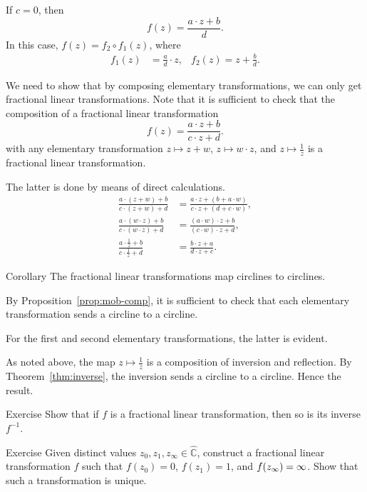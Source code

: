 If $c=0$, then
\[f(z) = \frac{a\cdot z + b}{ d}.\]
In this case, $f(z)=f_2\circ f_1 (z)$,
where 
\begin{align*}
f_1(z)&= \tfrac ad\cdot z,
&
f_2(z)= z+\tfrac bd.
\end{align*}

We need to show that by composing elementary transformations,
we can only get fractional linear transformations.
Note that it is sufficient to check that the composition of a fractional linear transformation
$$f(z) = \frac{a\cdot z + b}{c\cdot z + d}.$$
with any elementary transformation $z\mapsto z+w$, $z\mapsto w\cdot z$, and $z\mapsto \tfrac1z$ is a fractional linear transformation.

The latter is done by means of direct calculations.
\begin{align*}
\frac{a\cdot (z+w) + b}{c\cdot (z+w) + d}
&=
\frac{a\cdot z + (b+a\cdot w)}{c\cdot z + (d+c\cdot w)},
\\
\frac{a\cdot (w\cdot z) + b}{c\cdot (w\cdot z) + d}
&=
\frac{(a\cdot w)\cdot z + b}{(c\cdot w)\cdot z + d},
\\
\frac{a\cdot \frac1z + b}{c\cdot \frac1z + d}
&=
\frac{b\cdot z + a}{d\cdot z + c}.
\end{align*}
\qedsf


\begin{thm}{Corollary}\label{cor:cline-Moeb}
The fractional linear transformations map circlines to circlines.
\end{thm}

By Proposition~\ref{prop:mob-comp},
it is sufficient to check that each elementary transformation sends a circline to a circline.

For the first and second elementary transformations, the latter is evident.

As noted above,
the map $z\mapsto\tfrac1z$ is a composition of inversion and reflection.
By Theorem~\ref{thm:inverse}, the inversion sends a circline to a circline.
Hence the result.
\qeds

\begin{thm}{Exercise}\label{ex:inverse-Mob}
Show that if $f$ is a fractional linear transformation, then so is its inverse $f^{-1}$.
\end{thm}


\begin{thm}{Exercise}\label{ex:3-point-Mob}
Given distinct values $z_0,z_1,z_\infty\in \hat{\mathbb{C}}$,
construct a fractional linear transformation $f$ such that 
$f(z_0)=0$,
$f(z_1)=1$,
and 
$f(z_\infty)=\infty$.
Show that such a transformation is unique.
\end{thm}

